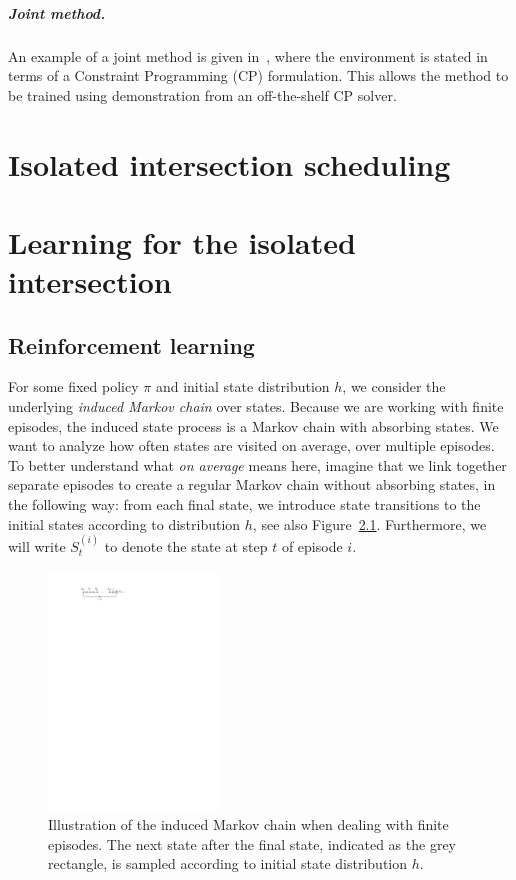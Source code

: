 \documentclass[a4paper]{report}
\theoremstyle{definition}
\theoremstyle{plain}
\begin{document}
\paragraph{Joint method.}
An example of a joint method is given
in~\cite{tasselEndEndReinforcementLearning2023}, where the environment is stated
in terms of a Constraint Programming (CP) formulation. This allows the method to
be trained using demonstration from an off-the-shelf CP solver.


\chapter{Isolated intersection scheduling}\label{chap:single}

\chapter{Learning for the isolated intersection}\label{chap:single-learning}

\section{Reinforcement learning}


For some fixed policy $\pi$ and initial state distribution $h$, we consider the
underlying \textit{induced Markov chain} over states. Because we are working with finite
episodes, the induced state process is a Markov chain with absorbing states.
%
We want to analyze how often states are visited on average, over multiple episodes.
%
To better understand what \textit{on average} means here, imagine that we link
together separate episodes to create a regular Markov chain without absorbing
states, in the following way: from each final state, we introduce state
transitions to the initial states according to distribution $h$, see also
Figure~\ref{fig:episodic_MC}. Furthermore, we will write $S_{t}^{(i)}$ to denote
the state at step $t$ of episode $i$.

\begin{figure}[h]
  \centering
  \includegraphics[width=0.4\textwidth]{figures/episodic_markov_chain.pdf}
  \caption{Illustration of the induced Markov chain when dealing with finite
    episodes. The next state after the final state, indicated as the grey
    rectangle, is sampled according to initial state distribution $h$.}
  \label{fig:episodic_MC}
\end{figure}
\end{document}
